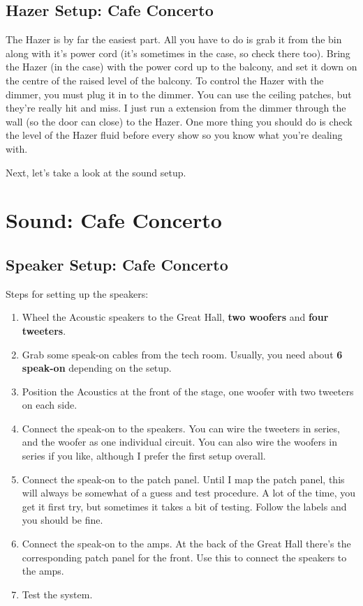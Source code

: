 \documentclass[11pt,a4paper]{book}
\begin{document}
\subsection{Hazer Setup: Cafe Concerto}
The Hazer is by far the easiest part. All you have to do is grab it from the bin along with it's power cord (it's sometimes in the case, so check there too). Bring the Hazer (in the case) with the power cord up to the balcony, and set it down on the centre of the raised level of the balcony. To control the Hazer with the dimmer, you must plug it in to the dimmer. You can use the ceiling patches, but they're really hit and miss. I just run a extension from the dimmer through the wall (so the door can close) to the Hazer. One more thing you should do is check the level of the Hazer fluid before every show so you know what you're dealing with.

Next, let's take a look at the sound setup.

\section{Sound: Cafe Concerto}
\subsection{Speaker Setup: Cafe Concerto}

Steps for setting up the speakers:
\begin{enumerate}
\item Wheel the Acoustic speakers to the Great Hall, \textbf{two woofers} and \textbf{four tweeters}.
\item Grab some speak-on cables from the tech room. Usually, you need about \textbf{6 speak-on} depending on the setup.
\item Position the Acoustics at the front of the stage, one woofer with two tweeters on each side.
\item Connect the speak-on to the speakers. You can wire the tweeters in series, and the woofer as one individual circuit. You can also wire the woofers in series if you like, although I prefer the first setup overall.
\item Connect the speak-on to the patch panel. Until I map the patch panel, this will always be somewhat of a guess and test procedure. A lot of the time, you get it first try, but sometimes it takes a bit of testing. Follow the labels and you should be fine.
\item Connect the speak-on to the amps. At the back of the Great Hall there's the corresponding patch panel for the front. Use this to connect the speakers to the amps.
\item Test the system.
\end{enumerate} 
\end{document}
